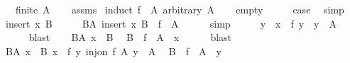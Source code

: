 \begin{isabellebody}
\ \ \ {\isachardoublequoteopen}finite\ A{\isachardoublequoteclose}\isanewline
%
\isadelimproof
\ \ %
\endisadelimproof
%
\isatagproof
{}\isamarkupfalse%
\ assms\isanewline
{}\isamarkupfalse%
\ {\isacharparenleft}{\kern0pt}induct\ {\isachardoublequoteopen}f\ {\isacharbackquote}{\kern0pt}\ A{\isachardoublequoteclose}\ arbitrary{\isacharcolon}{\kern0pt}\ A{\isacharparenright}{\kern0pt}\isanewline
\ \ \isamarkupfalse%
\ empty\isanewline
\ \ \isamarkupfalse%
\ \isamarkupfalse%
\ {\isacharquery}{\kern0pt}case\ \isamarkupfalse%
\ simp\isanewline
{}\isamarkupfalse%
\isanewline
\ \ \isamarkupfalse%
\ {\isacharparenleft}{\kern0pt}insert\ x\ B{\isacharparenright}{\kern0pt}\isanewline
\ \ \isamarkupfalse%
\ \isamarkupfalse%
\ B{\isacharunderscore}{\kern0pt}A{\isacharcolon}{\kern0pt}\ {\isachardoublequoteopen}insert\ x\ B\ {\isacharequal}{\kern0pt}\ f\ {\isacharbackquote}{\kern0pt}\ A{\isachardoublequoteclose}\isanewline
\ \ \ \ \isamarkupfalse%
\ simp\isanewline
\ \ \isamarkupfalse%
\ \isamarkupfalse%
\ y\ \ {\isachardoublequoteopen}x\ {\isacharequal}{\kern0pt}\ f\ y{\isachardoublequoteclose}\ \ {\isachardoublequoteopen}y\ {\isasymin}\ A{\isachardoublequoteclose}\isanewline
\ \ \ \ \isamarkupfalse%
\ blast\isanewline
\ \ \isamarkupfalse%
\ B{\isacharunderscore}{\kern0pt}A\ {\isacartoucheopen}x\ {\isasymnotin}\ B{\isacartoucheclose}\ \isamarkupfalse%
\ {\isachardoublequoteopen}B\ {\isacharequal}{\kern0pt}\ f\ {\isacharbackquote}{\kern0pt}\ A\ {\isacharminus}{\kern0pt}\ {\isacharbraceleft}{\kern0pt}x{\isacharbraceright}{\kern0pt}{\isachardoublequoteclose}\isanewline
\ \ \ \ \isamarkupfalse%
\ blast\isanewline
\ \ \isamarkupfalse%
\ B{\isacharunderscore}{\kern0pt}A\ {\isacartoucheopen}x\ {\isasymnotin}\ B{\isacartoucheclose}\ {\isacartoucheopen}x\ {\isacharequal}{\kern0pt}\ f\ y{\isacartoucheclose}\ {\isacartoucheopen}inj{\isacharunderscore}{\kern0pt}on\ f\ A{\isacartoucheclose}\ {\isacartoucheopen}y\ {\isasymin}\ A{\isacartoucheclose}\ \isamarkupfalse%
\ {\isachardoublequoteopen}B\ {\isacharequal}{\kern0pt}\ f\ {\isacharbackquote}{\kern0pt}\ {\isacharparenleft}{\kern0pt}A\ {\isacharminus}{\kern0pt}\ {\isacharbraceleft}{\kern0pt}y{\isacharbraceright}{\kern0pt}{\isacharparenright}{\kern0pt}{\isachardoublequoteclose}\isanewline

\end{isabellebody}
